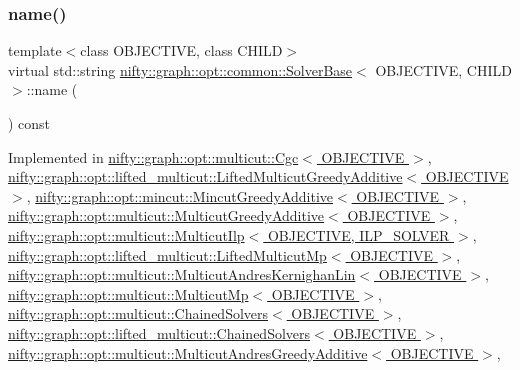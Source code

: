 \subsubsection{\texorpdfstring{name()}{name()}}
{\footnotesize\ttfamily template$<$class O\+B\+J\+E\+C\+T\+I\+VE, class C\+H\+I\+LD$>$ \\
virtual std\+::string \hyperlink{classnifty_1_1graph_1_1opt_1_1common_1_1SolverBase}{nifty\+::graph\+::opt\+::common\+::\+Solver\+Base}$<$ O\+B\+J\+E\+C\+T\+I\+VE, C\+H\+I\+LD $>$\+::name (\begin{DoxyParamCaption}{ }\end{DoxyParamCaption}) const\hspace{0.3cm}{\ttfamily [pure virtual]}}



Implemented in \hyperlink{classnifty_1_1graph_1_1opt_1_1multicut_1_1Cgc_a1c7194ad33e321f737b2ca33decd33f8}{nifty\+::graph\+::opt\+::multicut\+::\+Cgc$<$ O\+B\+J\+E\+C\+T\+I\+V\+E $>$}, \hyperlink{classnifty_1_1graph_1_1opt_1_1lifted__multicut_1_1LiftedMulticutGreedyAdditive_aa7320a44731a6784ec5151b4c680d4b4}{nifty\+::graph\+::opt\+::lifted\+\_\+multicut\+::\+Lifted\+Multicut\+Greedy\+Additive$<$ O\+B\+J\+E\+C\+T\+I\+V\+E $>$}, \hyperlink{classnifty_1_1graph_1_1opt_1_1mincut_1_1MincutGreedyAdditive_a2a3351733ab0dc823eb35947c92fa227}{nifty\+::graph\+::opt\+::mincut\+::\+Mincut\+Greedy\+Additive$<$ O\+B\+J\+E\+C\+T\+I\+V\+E $>$}, \hyperlink{classnifty_1_1graph_1_1opt_1_1multicut_1_1MulticutGreedyAdditive_adf548d9855d44d4ec6b03aabee9f7e8d}{nifty\+::graph\+::opt\+::multicut\+::\+Multicut\+Greedy\+Additive$<$ O\+B\+J\+E\+C\+T\+I\+V\+E $>$}, \hyperlink{classnifty_1_1graph_1_1opt_1_1multicut_1_1MulticutIlp_ae16cee89b02c93b4d2af91f39411411e}{nifty\+::graph\+::opt\+::multicut\+::\+Multicut\+Ilp$<$ O\+B\+J\+E\+C\+T\+I\+V\+E, I\+L\+P\+\_\+\+S\+O\+L\+V\+E\+R $>$}, \hyperlink{classnifty_1_1graph_1_1opt_1_1lifted__multicut_1_1LiftedMulticutMp_a5c218aa3ae258bb4c62a1b1c25449fba}{nifty\+::graph\+::opt\+::lifted\+\_\+multicut\+::\+Lifted\+Multicut\+Mp$<$ O\+B\+J\+E\+C\+T\+I\+V\+E $>$}, \hyperlink{classnifty_1_1graph_1_1opt_1_1multicut_1_1MulticutAndresKernighanLin_ac4b9f02bd36b35faf2ace3e87a224dcc}{nifty\+::graph\+::opt\+::multicut\+::\+Multicut\+Andres\+Kernighan\+Lin$<$ O\+B\+J\+E\+C\+T\+I\+V\+E $>$}, \hyperlink{classnifty_1_1graph_1_1opt_1_1multicut_1_1MulticutMp_ad70677c1535224e3ebd403d30faccbd9}{nifty\+::graph\+::opt\+::multicut\+::\+Multicut\+Mp$<$ O\+B\+J\+E\+C\+T\+I\+V\+E $>$}, \hyperlink{classnifty_1_1graph_1_1opt_1_1multicut_1_1ChainedSolvers_a32a1e08e4650b8004d3e97afadec2380}{nifty\+::graph\+::opt\+::multicut\+::\+Chained\+Solvers$<$ O\+B\+J\+E\+C\+T\+I\+V\+E $>$}, \hyperlink{classnifty_1_1graph_1_1opt_1_1lifted__multicut_1_1ChainedSolvers_af1a1069a6d390a04f9ac547600ea09e3}{nifty\+::graph\+::opt\+::lifted\+\_\+multicut\+::\+Chained\+Solvers$<$ O\+B\+J\+E\+C\+T\+I\+V\+E $>$}, \hyperlink{classnifty_1_1graph_1_1opt_1_1multicut_1_1MulticutAndresGreedyAdditive_a2e3775af34622f15e57c60986e2d15d4}{nifty\+::graph\+::opt\+::multicut\+::\+Multicut\+Andres\+Greedy\+Additive$<$ O\+B\+J\+E\+C\+T\+I\+V\+E $>$}, 
